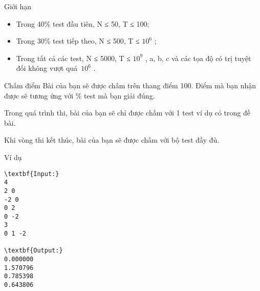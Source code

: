 Giới hạn  
\begin{itemize}
	\item     Trong 40\% test đầu tiên, N ≤ 50, T ≤ 100;   
	\item     Trong 30\% test tiếp theo, N ≤ 500, T ≤ $10^{6}$    ;   
	\item     Trong tất cả các test, N ≤ 5000, T ≤ $10^{9}$    , a, b, c và các tọa độ có trị tuyệt đối không vượt quá $10^{6}$    .   
\end{itemize}
   Chấm điểm  
Bài của bạn sẽ được chấm trên thang điểm 100. Điểm mà bạn nhận được sẽ tương ứng với \% test mà bạn giải đúng.  

   Trong quá trình thi, bài của bạn sẽ chỉ được chấm với 1 test ví dụ có trong đề bài.  

   Khi vòng thi kết thúc, bài của bạn sẽ được chấm với bộ test đầy đủ.  
\begin{itemize}
\end{itemize}
   Ví dụ  
\begin{verbatim}
\textbf{Input:}
4
2 0
-2 0
0 2
0 -2
3
0 1 -2

\textbf{Output:}
0.000000
1.570796
0.785398
0.643806
\end{verbatim}